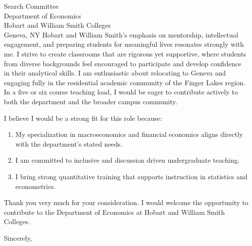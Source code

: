\documentclass[11pt,letterpaper]{letter}
\begin{document}
\begin{letter}{
Search Committee \\
Department of Economics \\
Hobart and William Smith Colleges \\
Geneva, NY
}
Hobart and William Smith’s emphasis on mentorship, intellectual engagement, and preparing students for meaningful lives resonates strongly with me. I strive to create classrooms that are rigorous yet supportive, where students from diverse backgrounds feel encouraged to participate and develop confidence in their analytical skills. I am enthusiastic about relocating to Geneva and engaging fully in the residential academic community of the Finger Lakes region. In a five or six course teaching load, I would be eager to contribute actively to both the department and the broader campus community.

I believe I would be a strong fit for this role because:
\begin{enumerate}
    \item My specialization in macroeconomics and financial economics aligns directly with the department’s stated needs.
    \item I am committed to inclusive and discussion driven undergraduate teaching.
    \item I bring strong quantitative training that supports instruction in statistics and econometrics.
\end{enumerate}

Thank you very much for your consideration. I would welcome the opportunity to contribute to the Department of Economics at Hobart and William Smith Colleges.

\closing{Sincerely,}

\end{letter}
\end{document}
